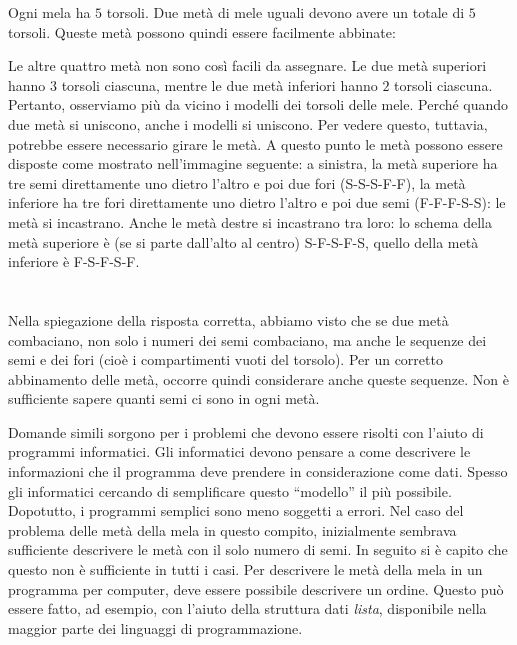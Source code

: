 {{{\centering%
\par}

Ogni mela ha $5$ torsoli. Due metà di mele uguali devono avere un totale di $5$ torsoli. Queste metà possono quindi essere facilmente abbinate:

{\centering%
\par}

Le altre quattro metà non sono così facili da assegnare. Le due metà superiori hanno $3$ torsoli ciascuna, mentre le due metà inferiori hanno $2$ torsoli ciascuna. Pertanto, osserviamo più da vicino i modelli dei torsoli delle mele.  Perché quando due metà si uniscono, anche i modelli si uniscono. Per vedere questo, tuttavia, potrebbe essere necessario girare le metà.  A questo punto le metà possono essere disposte come mostrato nell’immagine seguente: a sinistra, la metà superiore ha tre semi direttamente uno dietro l’altro e poi due fori (S-S-S-F-F), la metà inferiore ha tre fori direttamente uno dietro l’altro e poi due semi (F-F-F-S-S): le metà si incastrano. Anche le metà destre si incastrano tra loro: lo schema della metà superiore è (se si parte dall’alto al centro) S-F-S-F-S, quello della metà inferiore è F-S-F-S-F.

{\centering%
\par}



\section*{\BrochureItsInformatics}
Nella spiegazione della risposta corretta, abbiamo visto che se due metà combaciano, non solo i numeri dei semi combaciano, ma anche le sequenze dei semi e dei fori (cioè i compartimenti vuoti del torsolo). Per un corretto abbinamento delle metà, occorre quindi considerare anche queste sequenze. Non è sufficiente sapere quanti semi ci sono in ogni metà.

Domande simili sorgono per i problemi che devono essere risolti con l’aiuto di programmi informatici. Gli informatici devono pensare a come descrivere le informazioni che il programma deve prendere in considerazione come dati. Spesso gli informatici cercando di semplificare questo \enquote{modello} il più possibile.  Dopotutto, i programmi semplici sono meno soggetti a errori. Nel caso del problema delle metà della mela in questo compito, inizialmente sembrava sufficiente descrivere le metà con il solo numero di semi. In seguito si è capito che questo non è sufficiente in tutti i casi. Per descrivere le metà della mela in un programma per computer, deve essere possibile descrivere un ordine. Questo può essere fatto, ad esempio, con l’aiuto della struttura dati \emph{lista}, disponibile nella maggior parte dei linguaggi di programmazione.



}}
